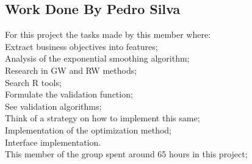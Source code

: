 \newpage

\subsection{Work Done By Pedro Silva}

\quad For this project the tasks made by this member where:\\

\quad \textbullet Extract business objectives into features;\\

\quad \textbullet Analysis of the exponential smoothing algorithm;\\

\quad \textbullet Research in GW and RW methods;\\

\quad \textbullet Search R tools;\\

\quad \textbullet Formulate the validation function;\\

\quad \textbullet See validation algorithms;\\

\quad \textbullet Think of a strategy on how to implement this same;\\

\quad \textbullet Implementation of the optimization method;\\

\quad \textbullet Interface implementation.\\


This member of the group spent around 65 hours in this project;